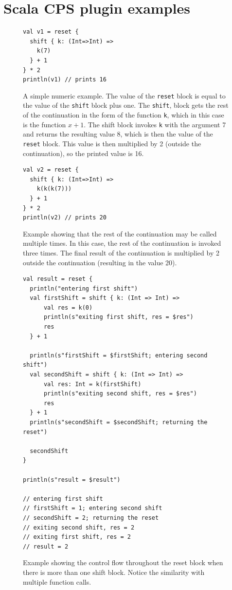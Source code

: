 
\chapter{Scala CPS plugin examples}\label{chap:cps-examples}

\begin{figure}[h!]
\begin{lstlisting}
val v1 = reset {
  shift { k: (Int=>Int) =>
    k(7)
  } + 1
} * 2
println(v1) // prints 16
\end{lstlisting}
\caption{A simple numeric example. The value of the \texttt{reset} block is equal to the value of the \texttt{shift} block plus one. The \texttt{shift}, block gets the rest of the continuation in the form of the function \texttt{k}, which in this case is the function \(x + 1\). The shift block invokes \texttt{k} with the argument 7 and returns the resulting value 8, which is then the value of the \texttt{reset} block. This value is then multiplied by 2 (outside the continuation), so the printed value is 16.}
\label{fig:example_cps_1}
\end{figure}




\begin{figure}[h!]
\begin{lstlisting}
val v2 = reset {
  shift { k: (Int=>Int) =>
    k(k(k(7)))
  } + 1
} * 2
println(v2) // prints 20
\end{lstlisting}
\caption{Example showing that the rest of the continuation may be called multiple times. In this case, the rest of the continuation is invoked three times. The final result of the continuation is multiplied by 2 outside the continuation (resulting in the value 20).}
\label{fig:example_cps_2}
\end{figure}




\begin{figure}[h!] 
\begin{lstlisting}
val result = reset {
  println("entering first shift")
  val firstShift = shift { k: (Int => Int) =>
      val res = k(0)
      println(s"exiting first shift, res = $res")
      res
  } + 1

  println(s"firstShift = $firstShift; entering second shift")
  val secondShift = shift { k: (Int => Int) =>
      val res: Int = k(firstShift)
      println(s"exiting second shift, res = $res")
      res
  } + 1
  println(s"secondShift = $secondShift; returning the reset")

  secondShift
}

println(s"result = $result")

// entering first shift
// firstShift = 1; entering second shift
// secondShift = 2; returning the reset
// exiting second shift, res = 2
// exiting first shift, res = 2
// result = 2
\end{lstlisting}
\caption{Example showing the control flow throughout the reset block when there is more than one shift block. Notice the similarity with multiple function calls.}
\label{fig:example_cps_step_by_step}
\end{figure}



